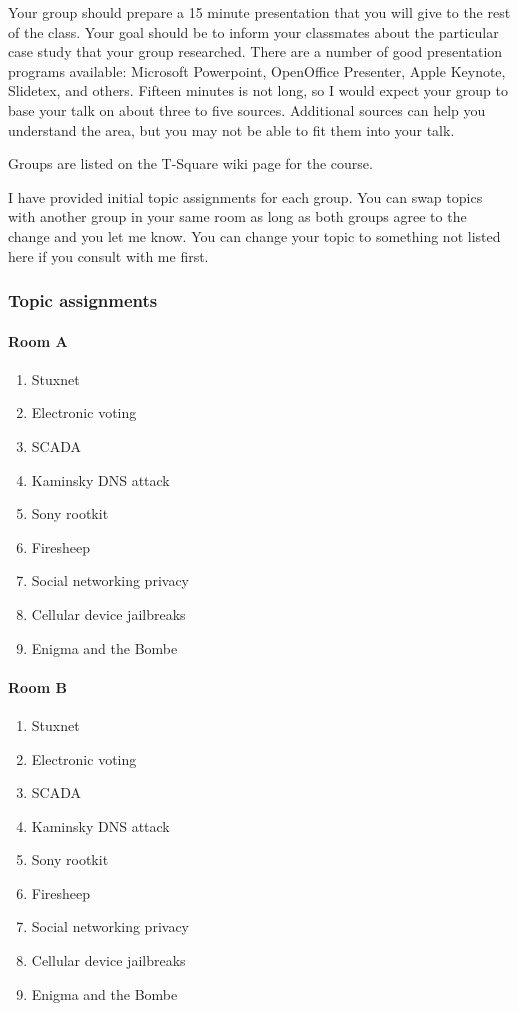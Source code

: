 \documentclass[letterpaper]{article}
\begin{document}
Your group should prepare a 15 minute presentation that you will give to the rest of the class. Your goal should be to inform your classmates about the particular case study that your group researched. There are a number of good presentation programs available: Microsoft Powerpoint, OpenOffice Presenter, Apple Keynote, Slidetex, and others. Fifteen minutes is not long, so I would expect your group to base your talk on about three to five sources. Additional sources can help you understand the area, but you may not be able to fit them into your talk.

Groups are listed on the T-Square wiki page for the course.

I have provided initial topic assignments for each group. You can swap topics with another group in your same room as long as both groups agree to the change and you let me know. You can change your topic to something not listed here if you consult with me first.

\subsubsection*{Topic assignments}

\begin{minipage}[t]{0.5\columnwidth}
\paragraph{Room A}
\begin{enumerate}
\item Stuxnet
\item Electronic voting
\item SCADA
\item Kaminsky DNS attack
\item Sony rootkit 
\item Firesheep
\item Social networking privacy
\item Cellular device jailbreaks
\item Enigma and the Bombe
\end{enumerate}
\end{minipage}
\begin{minipage}[t]{0.5\columnwidth}
\paragraph{Room B}
\begin{enumerate}
\item Stuxnet
\item Electronic voting
\item SCADA
\item Kaminsky DNS attack
\item Sony rootkit 
\item Firesheep
\item Social networking privacy
\item Cellular device jailbreaks
\item Enigma and the Bombe
\end{enumerate}
\end{minipage}
\end{document}
